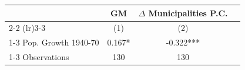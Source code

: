 \begin{tabular}{l*{3}{c}} \toprule
& GM & $\Delta$ Municipalities P.C. \\
\cmidrule(lr){2-2} \cmidrule(lr){3-3}
&\multicolumn{1}{c}{(1)} & \multicolumn{1}{c}{(2)} \\
\cmidrule(lr){1-3}
 Pop. Growth 1940-70 & 0.167* & -0.322*** \\
\cmidrule(lr){1-3}
Observations & 130 & 130 \\
\bottomrule
\end{tabular}
